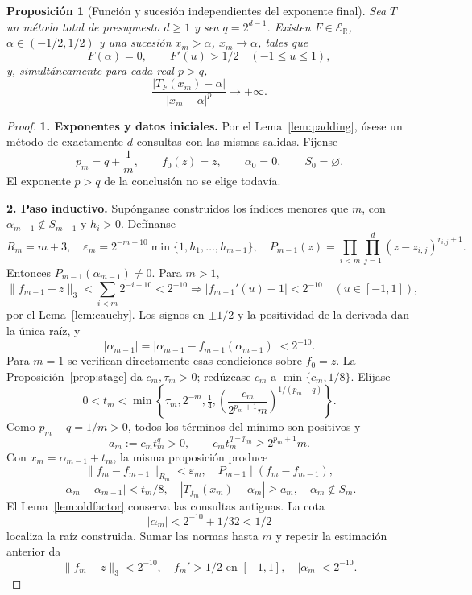 \documentclass[11pt,a4paper]{article}
\numberwithin{equation}{section}
\newtheorem{proposition}[theorem]{Proposición}
\theoremstyle{definition}
\theoremstyle{remark}
\newcommand{\R}{\mathbb R}
\newcommand{\ER}{\mathcal E_{\R}}
\newcommand{\paso}[1]{\par\smallskip\noindent\textbf{#1}\quad}
\begin{document}
\begin{proposition}[Función y sucesión independientes del exponente final]\label{prop:allp}
Sea $T$ un método total de presupuesto $d\ge1$ y sea $q=2^{d-1}$. Existen $F\in\ER$, $\alpha\in(-1/2,1/2)$ y una sucesión $x_m>\alpha$, $x_m\to\alpha$, tales que
\[
F(\alpha)=0,\qquad F'(u)>1/2\quad(-1\le u\le1),
\]
y, simultáneamente para cada real $p>q$,
\[
\frac{|T_F(x_m)-\alpha|}{|x_m-\alpha|^p}\longrightarrow+\infty.
\]
\end{proposition}
\begin{proof}
\paso{1. Exponentes y datos iniciales.}
Por el Lema~\ref{lem:padding}, úsese un método de exactamente $d$ consultas con las mismas salidas. Fíjense
\[
p_m=q+\frac1m,\qquad f_0(z)=z,\qquad\alpha_0=0,\qquad S_0=\varnothing.
\]
El exponente $p>q$ de la conclusión no se elige todavía.
\paso{2. Paso inductivo.}
Supónganse construidos los índices menores que $m$, con $\alpha_{m-1}\notin S_{m-1}$ y $h_i>0$. Defínanse
\[
R_m=m+3,\quad\varepsilon_m=2^{-m-10}\min\{1,h_1,\ldots,h_{m-1}\},
\quad
P_{m-1}(z)=\prod_{i<m}\prod_{j=1}^d(z-z_{i,j})^{r_{i,j}+1}.
\]
Entonces $P_{m-1}(\alpha_{m-1})\ne0$. Para $m>1$,
\[
\|f_{m-1}-z\|_3<\sum_{i<m}2^{-i-10}<2^{-10}
\Longrightarrow |f_{m-1}'(u)-1|<2^{-10}\quad(u\in[-1,1]),
\]
por el Lema~\ref{lem:cauchy}. Los signos en $\pm1/2$ y la positividad de la derivada dan la única raíz, y
\[
|\alpha_{m-1}|=|\alpha_{m-1}-f_{m-1}(\alpha_{m-1})|<2^{-10}.
\]
Para $m=1$ se verifican directamente esas condiciones sobre $f_0=z$.
La Proposición~\ref{prop:stage} da $c_m,\tau_m>0$; redúzcase $c_m$ a $\min\{c_m,1/8\}$. Elíjase
\begin{equation}\label{eq:allpchoose}
0<t_m<\min\left\{\tau_m,2^{-m},\tfrac14,
\left(\frac{c_m}{2^{p_m+1}m}\right)^{1/(p_m-q)}\right\}.
\end{equation}
Como $p_m-q=1/m>0$, todos los términos del mínimo son positivos y
\begin{equation}\label{eq:allpquotient}
a_m:=c_mt_m^q>0,\qquad c_mt_m^{q-p_m}\ge2^{p_m+1}m.
\end{equation}
Con $x_m=\alpha_{m-1}+t_m$, la misma proposición produce
\[
\|f_m-f_{m-1}\|_{R_m}<\varepsilon_m,\quad P_{m-1}\mid(f_m-f_{m-1}),
\]
\[
|\alpha_m-\alpha_{m-1}|<t_m/8,\quad
|T_{f_m}(x_m)-\alpha_m|\ge a_m,\quad\alpha_m\notin S_m.
\]
El Lema~\ref{lem:oldfactor} conserva las consultas antiguas. La cota
\[
|\alpha_m|<2^{-10}+1/32<1/2
\]
localiza la raíz construida. Sumar las normas hasta $m$ y repetir la estimación anterior da
\[
\|f_m-z\|_3<2^{-10},\quad f_m'>1/2\text{ en }[-1,1],\quad |\alpha_m|<2^{-10}.
\]
\end{proof}
\end{document}
